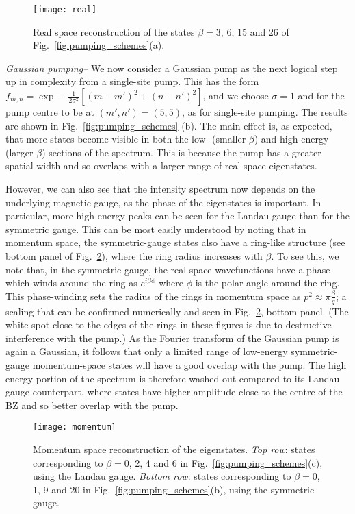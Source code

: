 \begin{figure}[tb] \centering
  \texttt{[image: real]}
  \caption{Real space reconstruction of the states $\beta=3$, 6, 15
and 26 of Fig.~\ref{fig:pumping_schemes}(a).}
  \label{fig:delta_real_sp}
\end{figure}

{\em{Gaussian pumping--}} We now consider a Gaussian pump as the next
logical step up in complexity from a single-site pump. This has the
form $f_{m,n} = \exp- \frac{1}{2\sigma^2} \left[(m-m')^2 + (n-n')^2
\right]$, and we choose $\sigma =1$ and for the pump centre to be at
$(m',n') = (5,5)$, as for single-site pumping. The results are shown
in Fig.~\ref{fig:pumping_schemes} (b). The main effect is, as
expected, that more states become visible in both the low- (smaller
$\beta$) and high-energy (larger $\beta$) sections of the
spectrum. This is because the pump has a greater spatial width and so
overlaps with a larger range of real-space eigenstates.

However, we can also see that the intensity spectrum now depends on
the underlying magnetic gauge, as the phase of the eigenstates is
important. In particular, more high-energy peaks can be seen for the
Landau gauge than for the symmetric gauge. This can be most easily
understood by noting that in momentum space, the symmetric-gauge
states also have a ring-like structure (see bottom panel of
Fig.~\ref{fig:hom_mom_sp}), where the ring radius increases with
$\beta$. To see this, we note that, in the symmetric gauge, the
real-space wavefunctions have a phase which winds around the ring as
$e^{i\beta \phi}$ where $\phi$ is the polar angle around the
ring. This phase-winding sets the radius of the rings in momentum
space as $p^2 \approx \pi \frac{\beta}{q}$; a scaling that can be
confirmed numerically and seen in Fig.~\ref{fig:hom_mom_sp}, bottom
panel. (The white spot close to the edges of the rings in these
figures is due to destructive interference with the pump.)  As the
Fourier transform of the Gaussian pump is again a Gaussian, it follows
that only a limited range of low-energy symmetric-gauge momentum-space
states will have a good overlap with the pump. The high energy portion
of the spectrum is therefore washed out compared to its Landau gauge
counterpart, where states have higher amplitude close to the centre of
the BZ and so better overlap with the pump.

\begin{figure}[tb]\centering
  \texttt{[image: momentum]}
  \caption{Momentum space reconstruction of the eigenstates. \emph{Top
row}: states corresponding to $\beta=0$, 2, 4 and 6 in
Fig.~\ref{fig:pumping_schemes}(c), using the Landau gauge.
\emph{Bottom row}: states corresponding to $\beta=0$, 1, 9 and 20 in
Fig.~\ref{fig:pumping_schemes}(b), using the symmetric gauge.}
  \label{fig:hom_mom_sp}
\end{figure}

